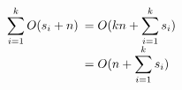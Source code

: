 


\[ \sum_{i=1}^{k} O(s_{i}+n) \begin{array}[t]{l}
                    \displaystyle = O(kn + \sum_{i=1}^{k} s_{i}) \\
                    \displaystyle = O(n + \sum_{i=1}^{k} s_{i}) 
                           \end{array}
\]

